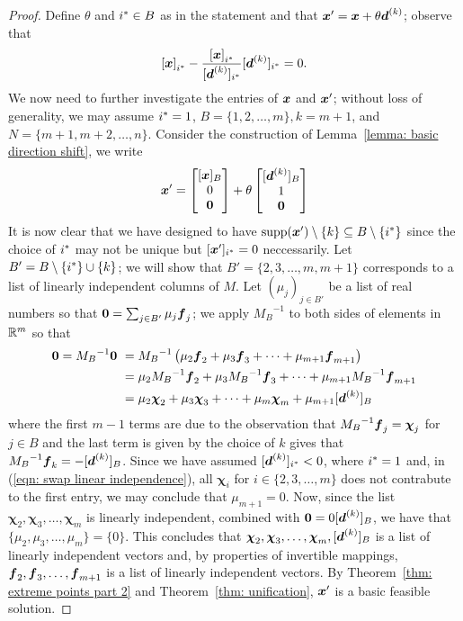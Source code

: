 \begin{proof}
Define $\theta$ and $i^\ast \in B$ as in the statement and that ${\boldsymbol x}' = {\boldsymbol x} + \theta {\boldsymbol d}^{(k)}$; observe that \[ {[{\boldsymbol x}]}_{i^\ast} - \frac{{[{\boldsymbol x}]}_{i^\ast}}{[{\boldsymbol d}^{(k)}]_{i^\ast}} [{\boldsymbol d}^{(k)}]_{i^\ast} = 0. \]  
We now need to further investigate the entries of ${\boldsymbol x}$ and ${\boldsymbol x}'$; without loss of generality, we may assume $i^\ast =1$, $B = \{1, 2, \dots, m\}, k = m+1$, and $N = \{m + 1, m + 2, \dots, n\}$. Consider the construction of Lemma~\ref{lemma: basic direction shift}, we write
\[ {\boldsymbol x}' = \begin{bmatrix} [{\boldsymbol x}]_B \\ 0 \\  \boldsymbol0 \end{bmatrix} + \theta \begin{bmatrix} [{\boldsymbol d}^{(k)}]_B \\ 1 \\ \boldsymbol0 \end{bmatrix} \] 
It is now clear that we have designed to have $\operatorname{supp}({\boldsymbol x}') \setminus \{k\} \subseteq B\setminus \{i^\ast\}$ since the choice of $i^\ast$ may not be unique but $[{\boldsymbol x}']_{i^\ast} = 0$ neccessarily. Let $B' = B\setminus \{i^\ast\} \cup\{k\}$; we will show that $B' = \{2, 3, \dots, m,  m+1\}$ corresponds to a list of linearly independent columns of $M$. Let $(\mu_j)_{j\in B'}$ be a list of real numbers so that $\boldsymbol 0 = \sum_{j\in B'} \mu_j {\boldsymbol f}_j$; we apply ${M_B}^{-1}$ to both sides of elements in $\mathbb R^m$ so that
\begin{equation}\label{eqn: swap linear independence}\begin{split}
\boldsymbol 0 =  {M_B}^{-1} \boldsymbol 0~& = {M_B}^{-1} \left( \mu_2 {\boldsymbol f}_2 + \mu_3 {\boldsymbol f}_3 + \dots + \mu_{m+1} {\boldsymbol f}_{m+1} \right) \\
& =   \mu_2 {M_B}^{-1}{\boldsymbol f}_2 + \mu_3 {M_B}^{-1}{\boldsymbol f}_3 + \dots + \mu_{m+1} {M_B}^{-1}{\boldsymbol f}_{m+1} \\
& =   \mu_2 \boldsymbol\chi_2 + \mu_3 \boldsymbol\chi_3 + \dots + \mu_m \boldsymbol\chi_m +  \mu_{m+1} [{\boldsymbol d}^{(k)}]_B
\end{split}\end{equation}
where the first $m-1$ terms are due to the observation that  ${M_B}^{-1} {\boldsymbol f}_j = \boldsymbol\chi_j$ for $j\in B$ and the last term is given by the choice of $k$ gives that $ {M_B}^{-1} {\boldsymbol f}_k = - [{\boldsymbol d}^{(k)}]_B$. Since we have assumed $[{\boldsymbol d}^{(k)}]_{i^\ast} < 0$, where $i^\ast = 1$ and, in (\ref{eqn: swap linear independence}), all $\bm\chi_i$ for $i\in\{2,3,\dots, m\}$ does not contrabute to the first entry, we may conclude that $\mu_{m+1} = 0$. Now, since the list $\bm\chi_2, \bm\chi_3, \dots, \bm\chi_m$ is linearly independent, combined with $\boldsymbol0 = 0 [{\boldsymbol d}^{(k)}]_B$, we have that $\{\mu_2, \mu_3, \dots, \mu_m\} = \{0\}$. This concludes that $\boldsymbol\chi_2, \boldsymbol\chi_3, \dots, \boldsymbol\chi_m, [{\boldsymbol d}^{(k)}]_{B}$ is a list of linearly independent vectors and, by properties of invertible mappings, ${\boldsymbol f}_2, {\boldsymbol f}_3, \dots, {\boldsymbol f}_{m+1}$ is a list of linearly independent vectors. By Theorem~\ref{thm: extreme points part 2} and Theorem~\ref{thm: unification}, ${\boldsymbol x}'$ is a basic feasible solution. 
\end{proof}


